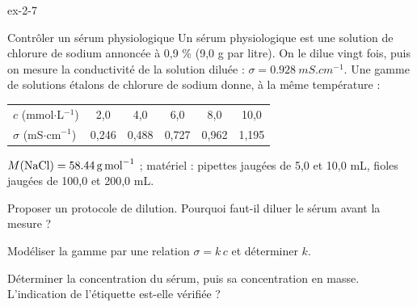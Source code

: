 \begin{blocLivre}{ex-2-7}
\begin{exercice}[2]{Contrôler un sérum physiologique}
Un sérum physiologique est une solution de chlorure de sodium annoncée à 0,9 \% (9,0 g par litre).
On le dilue vingt fois, puis on mesure la conductivité de la solution diluée : $\sigma=\qty{0,928}{mS.cm^{-1}}$.
Une gamme de solutions étalons de chlorure de sodium donne, à la même température :
\begin{center}\small\renewcommand{\arraystretch}{1.2}
\begin{tabular}{@{}l*{5}{c}@{}}\toprule
$c$ (mmol$\cdot$L$^{-1}$) & 2,0 & 4,0 & 6,0 & 8,0 & 10,0\\
$\sigma$ (mS$\cdot$cm$^{-1}$) & 0,246 & 0,488 & 0,727 & 0,962 & 1,195\\\bottomrule
\end{tabular}\end{center}
\begin{donnees}
$M(\ce{NaCl})=\qty{58,44}{g.mol^{-1}}$ ; matériel : pipettes jaugées de 5,0 et 10,0 mL, fioles jaugées de 100,0 et 200,0 mL.
\end{donnees}
\begin{questions}
\item Proposer un protocole de dilution. Pourquoi faut-il diluer le sérum avant la mesure ?
\item Modéliser la gamme par une relation $\sigma=k\,c$ et déterminer $k$.
\item Déterminer la concentration du sérum, puis sa concentration en masse. L'indication de l'étiquette est-elle vérifiée ?
\end{questions}
\end{exercice}
\end{blocLivre}
